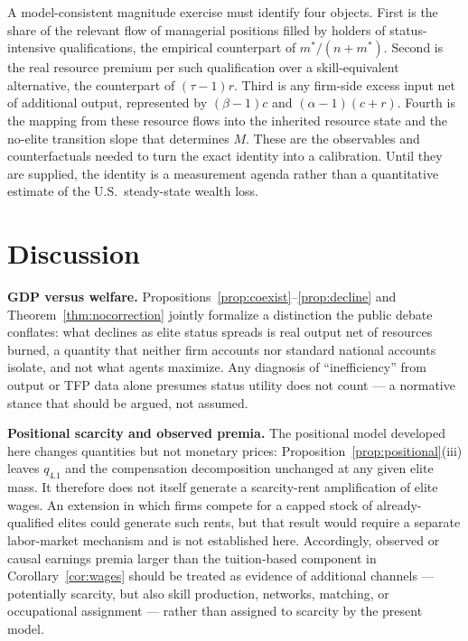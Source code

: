 \documentclass[12pt,letterpaper]{article}
\theoremstyle{definition}
\begin{document}
A model-consistent magnitude exercise must identify four objects.
First is the share of the relevant flow of managerial positions filled by holders of status-intensive qualifications, the empirical counterpart of $m^\ast/(n+m^\ast)$.
Second is the real resource premium per such qualification over a skill-equivalent alternative, the counterpart of $(\tau-1)r$.
Third is any firm-side excess input net of additional output, represented by $(\beta-1)c$ and $(\alpha-1)(c+r)$.
Fourth is the mapping from these resource flows into the inherited resource state and the no-elite transition slope that determines $M$.
These are the observables and counterfactuals needed to turn the exact identity into a calibration.
Until they are supplied, the identity is a measurement agenda rather than a quantitative estimate of the U.S.\ steady-state wealth loss.

\section{Discussion}\label{sec:discussion}

\textbf{GDP versus welfare.}
Propositions~\ref{prop:coexist}--\ref{prop:decline} and Theorem~\ref{thm:nocorrection} jointly formalize a distinction the public debate conflates: what declines as elite status spreads is real output net of resources burned, a quantity that neither firm accounts nor standard national accounts isolate, and not what agents maximize.
Any diagnosis of ``inefficiency'' from output or TFP data alone presumes status utility does not count --- a normative stance that should be argued, not assumed.

\textbf{Positional scarcity and observed premia.}
The positional model developed here changes quantities but not monetary prices: Proposition~\ref{prop:positional}(iii) leaves $q_{4.1}$ and the compensation decomposition unchanged at any given elite mass.
It therefore does not itself generate a scarcity-rent amplification of elite wages.
An extension in which firms compete for a capped stock of already-qualified elites could generate such rents, but that result would require a separate labor-market mechanism and is not established here.
Accordingly, observed or causal earnings premia larger than the tuition-based component in Corollary~\ref{cor:wages} should be treated as evidence of additional channels --- potentially scarcity, but also skill production, networks, matching, or occupational assignment --- rather than assigned to scarcity by the present model.
\end{document}
